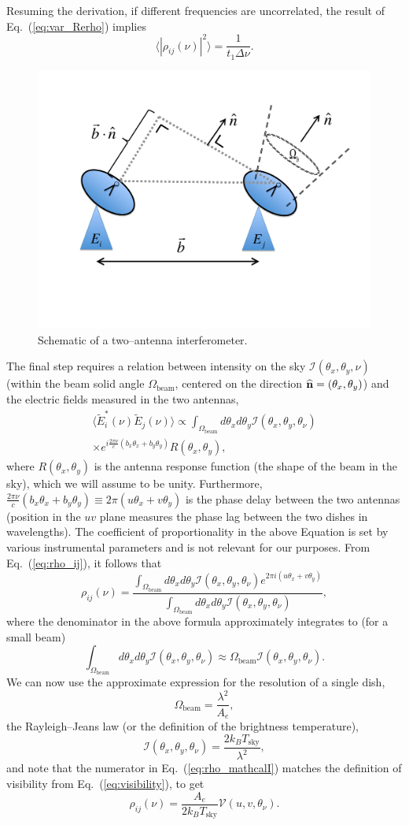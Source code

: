 \documentclass[aps,prd,twocolumn,floatfix,showpacs,superscriptaddress,nofootinbib]{revtex4-1}
\newcommand{\beq}{\begin{equation}}
\newcommand{\eeq}{\end{equation}}
\newcommand{\bga}{\begin{gathered}}
\newcommand{\ega}{\end{gathered}}
\newcommand{\eq}[1]{{Eq.~(#1)}}
\begin{document}
Resuming the derivation, if different frequencies are uncorrelated, the result of \eq{\ref{eq:var_Rerho}} implies
\beq
\langle|\rho_{ij}(\nu)|^2\rangle = \frac{1}{t_1\Delta \nu}.
\label{eq:var_rho}
\eeq
\begin{figure}
\centering
\includegraphics[width=.5\textwidth,keepaspectratio=true]{2antennae.pdf}
\caption{Schematic of a two--antenna interferometer.\label{fig:2antennae}}
\end{figure}
The final step requires a relation between intensity on the sky $\mathcal{I}(\theta_x,\theta_y, \nu)$ (within the beam solid angle $\Omega_\text{beam}$, centered on the direction ${\bf{\widehat n}}=(\theta_x,\theta_y)$) and the electric fields measured in the two antennas,
\beq
\bga
\langle \widetilde{E}_i^*(\nu)\widetilde{E}_j(\nu)\rangle \propto \int_{\Omega_\text{beam}} d\theta_xd\theta_y\mathcal{I}(\theta_x,\theta_y,\theta_\nu)\\
\times e^{ i\frac{2\pi\nu}{c}(b_x\theta_x + b_y\theta_y)  }R(\theta_x,\theta_y),
\ega
\label{eq:E_vs_mathcalI}
\eeq
where $R(\theta_x,\theta_y)$ is the antenna response function (the shape of the beam in the sky), which we will assume to be unity. Furthermore, $\frac{2\pi\nu}{c}(b_x\theta_x + b_y\theta_y)\equiv {2\pi}(u\theta_x + v\theta_y)$ is the phase delay between the two antennas (position in the $uv$ plane measures the phase lag between the two dishes in wavelengths). The coefficient of proportionality in the above Equation is set by various instrumental parameters and is not relevant for our purposes. From \eq{\ref{eq:rho_ij}}, it follows that
\beq
\rho_{ij}(\nu) = \frac{\int_{\Omega_\text{beam}}d\theta_xd\theta_y\mathcal{I}(\theta_x,\theta_y,\theta_\nu)e^{2\pi i(u\theta_x+v\theta_y)}}{\int_{\Omega_\text{beam}}d\theta_xd\theta_y\mathcal{I}(\theta_x,\theta_y,\theta_\nu)},
\label{eq:rho_mathcalI}
\eeq
where the denominator in the above formula approximately integrates to (for a small beam)
\beq
\int_{\Omega_\text{beam}}d\theta_xd\theta_y\mathcal{I}(\theta_x,\theta_y,\theta_\nu) \approx
\Omega_\text{beam} \mathcal{I}(\theta_x,\theta_y,\theta_\nu).
\label{eq:rho_denominator}
\eeq
We can now use the approximate expression for the resolution of a single dish,
\beq
\Omega_\text{beam} = \frac{\lambda^2}{A_e},
\label{eq:Omegab}
\eeq
the Rayleigh--Jeans law (or the definition of the brightness temperature),
\beq
\mathcal{I}(\theta_x,\theta_y,\theta_\nu) = \frac{2k_BT_\text{sky}}{\lambda^2},
\label{eq:I_Tsky}
\eeq
and note that the numerator in \eq{\ref{eq:rho_mathcalI}} matches the definition of visibility from \eq{\ref{eq:visibility}}, to get 
\beq
\rho_{ij}(\nu) = \frac{A_e}{2k_BT_\text{sky}}\mathcal{V}(u,v,\theta_\nu).
\label{eq:rho_V}
\eeq
\end{document}
